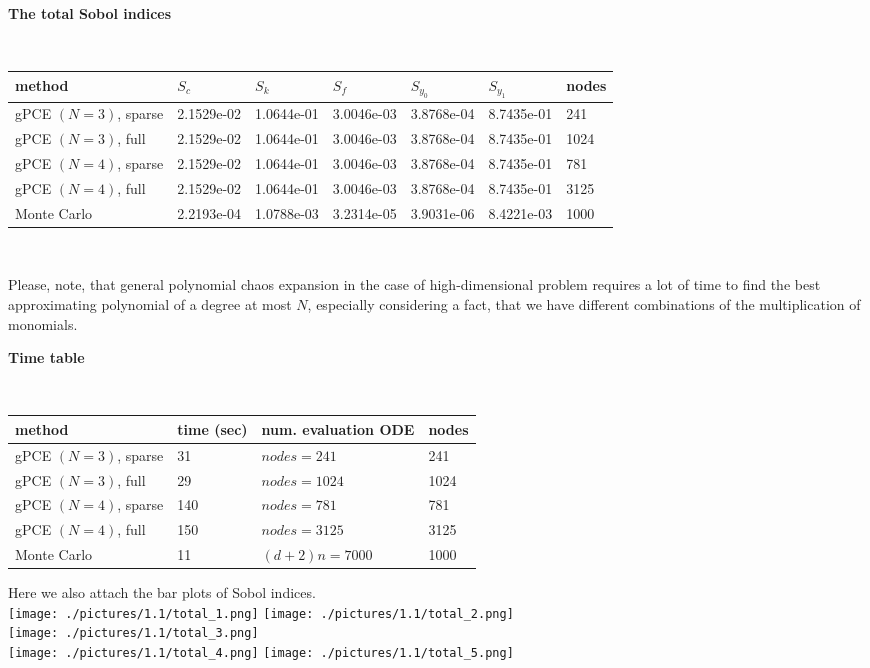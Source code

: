 \documentclass[11pt]{article}
\begin{document}
\begin{center} \textbf{The total Sobol indices}\\
\end{center}
\\
\begin{tabular}{|p{4.0cm}|p{2.2cm}|p{2.2cm}|p{2.2cm}|p{2.2cm}|p{2.2cm}|p{1.0cm}|}
\hline
method & $S_c$ & $S_k$ & $S_f$ & $S_y_0$ & $S_y_1$ & nodes \\
\hline
gPCE $(N=3)$, sparse &  2.1529e-02& 1.0644e-01& 3.0046e-03& 3.8768e-04&
 8.7435e-01 & 241 \\
gPCE $(N=3)$, full &   2.1529e-02& 1.0644e-01& 3.0046e-03& 3.8768e-04&
 8.7435e-01 & 1024 \\
gPCE $(N=4)$, sparse &  2.1529e-02& 1.0644e-01& 3.0046e-03& 3.8768e-04&
 8.7435e-01 & 781\\
gPCE $(N=4)$, full &   2.1529e-02& 1.0644e-01& 3.0046e-03& 3.8768e-04&
 8.7435e-01 & 3125\\
Monte Carlo &  2.2193e-04 &1.0788e-03& 3.2314e-05& 3.9031e-06&
 8.4221e-03 & 1000\\
\hline
\end{tabular}\\\par
 Please, note, that general polynomial chaos expansion in the case of high-dimensional problem requires a lot of time to find the best approximating polynomial of a degree at most $N$, especially considering a fact, that we have different  combinations of the multiplication of monomials.
\begin{center} \textbf{Time table}\\
\end{center}
\\
\begin{tabular}{|p{4.0cm}|p{2.2cm}|p{4cm}|p{2.2cm}|}
\hline
method & time (sec) & num. evaluation ODE & nodes\\
\hline
gPCE $(N=3)$, sparse & 31 & $nodes  = 241$ & 241 \\
gPCE $(N=3)$, full & 29 & $nodes  = 1024$& 1024 \\
gPCE $(N=4)$, sparse & 140& $nodes  = 781$& 781\\
gPCE $(N=4)$, full &150 & $nodes  = 3125$  &3125\\
Monte Carlo & 11 &$(d+2)n  = 7000 $  & 1000\\
\hline
\end{tabular}\newpage
Here we also attach the bar plots of Sobol indices.\\
 \texttt{[image: ./pictures/1.1/total\_1.png]}
 \texttt{[image: ./pictures/1.1/total\_2.png]}\\
 \texttt{[image: ./pictures/1.1/total\_3.png]}\\
 \texttt{[image: ./pictures/1.1/total\_4.png]}
 \texttt{[image: ./pictures/1.1/total\_5.png]}
\end{document}
